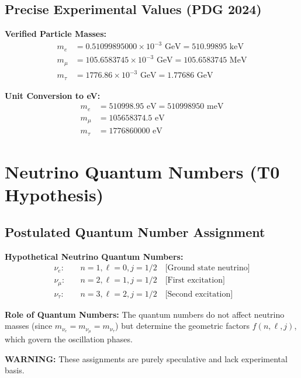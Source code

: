 \documentclass[12pt,a4paper]{article}
\begin{document}
	\subsection{Precise Experimental Values (PDG 2024)}
	
	\begin{experimental}
		\textbf{Verified Particle Masses:}
		\begin{align}
			m_e &= 0.51099895000 \times 10^{-3} \text{ GeV} = 510.99895 \text{ keV} \\
			m_\mu &= 105.6583745 \times 10^{-3} \text{ GeV} = 105.6583745 \text{ MeV} \\
			m_\tau &= 1776.86 \times 10^{-3} \text{ GeV} = 1.77686 \text{ GeV}
		\end{align}
		
		\textbf{Unit Conversion to eV:}
		\begin{align}
			m_e &= 510998.95 \text{ eV} = 510998950 \text{ meV} \\
			m_\mu &= 105658374.5 \text{ eV} \\
			m_\tau &= 1776860000 \text{ eV}
		\end{align}
	\end{experimental}
	
	\section{Neutrino Quantum Numbers (T0 Hypothesis)}
	
	\subsection{Postulated Quantum Number Assignment}
	
	\begin{speculation}
		\textbf{Hypothetical Neutrino Quantum Numbers:}
		\begin{align}
			\nu_e: &\quad n=1, \ell=0, j=1/2 \quad \text{[Ground state neutrino]} \\
			\nu_\mu: &\quad n=2, \ell=1, j=1/2 \quad \text{[First excitation]} \\
			\nu_\tau: &\quad n=3, \ell=2, j=1/2 \quad \text{[Second excitation]}
		\end{align}
		
		\textbf{Role of Quantum Numbers:}
		The quantum numbers do not affect neutrino masses (since \(m_{\nu_e} = m_{\nu_\mu} = m_{\nu_\tau}\)) but determine the geometric factors \(f(n, \ell, j)\), which govern the oscillation phases.
		
		\textbf{WARNING:} These assignments are purely speculative and lack experimental basis.
	\end{speculation}
	
\end{document}
